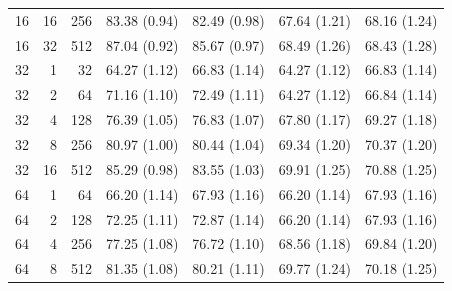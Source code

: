 \documentclass[11pt,letterpaper]{article}
\begin{document}
\begin{table}[p]
\begin{tabular}{@{}rrr rrrr@{}}
16 & 16 & 256 & 83.38 {\scriptsize (0.94)} & 82.49 {\scriptsize (0.98)} & 67.64 {\scriptsize (1.21)} & 68.16 {\scriptsize (1.24)} \\
16 & 32 & 512 & 87.04 {\scriptsize (0.92)} & 85.67 {\scriptsize (0.97)} & 68.49 {\scriptsize (1.26)} & 68.43 {\scriptsize (1.28)} \\
\midrule
32 & 1 & 32 & 64.27 {\scriptsize (1.12)} & 66.83 {\scriptsize (1.14)} & 64.27 {\scriptsize (1.12)} & 66.83 {\scriptsize (1.14)} \\
32 & 2 & 64 & 71.16 {\scriptsize (1.10)} & 72.49 {\scriptsize (1.11)} & 64.27 {\scriptsize (1.12)} & 66.84 {\scriptsize (1.14)} \\
32 & 4 & 128 & 76.39 {\scriptsize (1.05)} & 76.83 {\scriptsize (1.07)} & 67.80 {\scriptsize (1.17)} & 69.27 {\scriptsize (1.18)} \\
32 & 8 & 256 & 80.97 {\scriptsize (1.00)} & 80.44 {\scriptsize (1.04)} & 69.34 {\scriptsize (1.20)} & 70.37 {\scriptsize (1.20)} \\
32 & 16 & 512 & 85.29 {\scriptsize (0.98)} & 83.55 {\scriptsize (1.03)} & 69.91 {\scriptsize (1.25)} & 70.88 {\scriptsize (1.25)} \\
\midrule
64 & 1 & 64 & 66.20 {\scriptsize (1.14)} & 67.93 {\scriptsize (1.16)} & 66.20 {\scriptsize (1.14)} & 67.93 {\scriptsize (1.16)} \\
64 & 2 & 128 & 72.25 {\scriptsize (1.11)} & 72.87 {\scriptsize (1.14)} & 66.20 {\scriptsize (1.14)} & 67.93 {\scriptsize (1.16)} \\
64 & 4 & 256 & 77.25 {\scriptsize (1.08)} & 76.72 {\scriptsize (1.10)} & 68.56 {\scriptsize (1.18)} & 69.84 {\scriptsize (1.20)} \\
64 & 8 & 512 & 81.35 {\scriptsize (1.08)} & 80.21 {\scriptsize (1.11)} & 69.77 {\scriptsize (1.24)} & 70.18 {\scriptsize (1.25)} \\
\bottomrule
\end{tabular}
\end{table}
\end{document}
